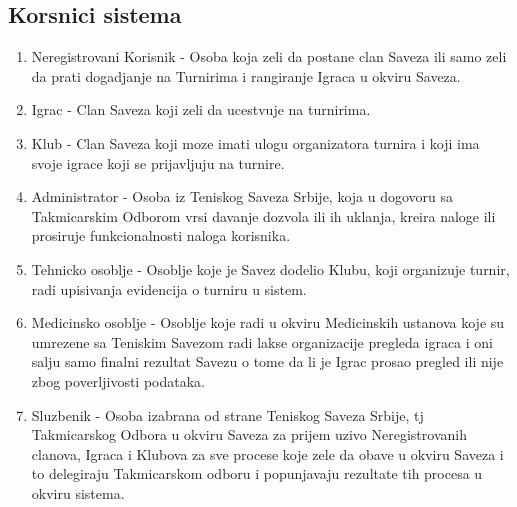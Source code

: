\documentclass{article}
\begin{document}
\subsection{Korsnici sistema}
\begin{enumerate}
        \item Neregistrovani Korisnik - Osoba koja zeli da postane clan Saveza ili samo zeli da prati dogadjanje na Turnirima i rangiranje Igraca u okviru Saveza.
        \item Igrac - Clan Saveza koji zeli da ucestvuje na turnirima.
        \item Klub - Clan Saveza koji moze imati ulogu organizatora turnira i koji ima svoje igrace koji se prijavljuju na turnire. 
        \item Administrator - Osoba iz Teniskog Saveza Srbije, koja u dogovoru sa Takmicarskim Odborom vrsi davanje dozvola ili ih uklanja, kreira naloge ili prosiruje funkcionalnosti naloga korisnika.
        \item Tehnicko osoblje - Osoblje koje je Savez dodelio Klubu, koji organizuje turnir, radi upisivanja evidencija o turniru u sistem. 
        \item Medicinsko osoblje - Osoblje koje radi u okviru Medicinskih ustanova koje su umrezene sa Teniskim Savezom radi lakse organizacije pregleda igraca i oni salju samo finalni rezultat Savezu o tome da li je Igrac prosao pregled ili nije zbog poverljivosti podataka.
        \item Sluzbenik - Osoba izabrana od strane Teniskog Saveza Srbije, tj Takmicarskog Odbora u okviru Saveza za prijem uzivo Neregistrovanih clanova, Igraca i Klubova za sve procese koje zele da obave u okviru Saveza i to delegiraju Takmicarskom odboru i popunjavaju rezultate tih procesa u okviru sistema. 
    \end{enumerate}
    
\end{document}
